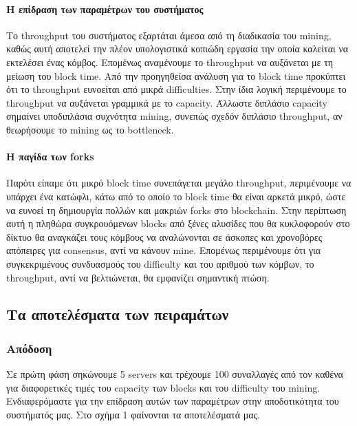 \documentclass[titlepage]{article}
\begin{document}
\paragraph{Η επίδραση των παραμέτρων του συστήματος}

Το throughput του συστήματος εξαρτάται άμεσα από τη διαδικασία του mining, καθώς αυτή αποτελεί την πλέον υπολογιστικά κοπιώδη εργασία την οποία καλείται να εκτελέσει ένας κόμβος. Επομένως αναμένουμε το throughput να αυξάνεται με τη μείωση του block time. Από την προηγηθείσα ανάλυση για το block time προκύπτει ότι το throughput ευνοείται από μικρά difficulties. Στην ίδια λογική περιμένουμε το throughput να αυξάνεται γραμμικά με το capacity. Άλλωστε διπλάσιο capacity σημαίνει υποδιπλάσια συχνότητα mining, συνεπώς σχεδόν διπλάσιο throughput, αν θεωρήσουμε το mining ως το bottleneck.

\paragraph{Η παγίδα των forks}

Παρότι είπαμε ότι μικρό block time συνεπάγεται μεγάλο throughput, περιμένουμε να υπάρχει ένα κατώφλι, κάτω από το οποίο το block time θα είναι αρκετά μικρό, ώστε να ευνοεί τη δημιουργία πολλών και μακριών forks στο blockchain. Στην περίπτωση αυτή η πληθώρα συγκρουόμενων blocks από ξένες αλυσίδες που θα κυκλοφορούν στο δίκτυο θα αναγκάζει τους κόμβους να αναλώνονται σε άσκοπες και χρονοβόρες απόπειρες για consensus, αντί να κάνουν mine. Επομένως περιμένουμε ότι για συγκεκριμένους συνδυασμούς του difficulty και του αριθμού των κόμβων, το throughput, αντί να βελτιώνεται, θα εμφανίζει σημαντική πτώση.

\subsection{Τα αποτελέσματα των πειραμάτων}

\subsubsection{Απόδοση}

Σε πρώτη φάση σηκώνουμε 5 servers και τρέχουμε 100 συναλλαγές από τον καθένα για διαφορετικές τιμές του capacity των blocks και του difficulty του mining. Ενδιαφερόμαστε για την επίδραση αυτών των παραμέτρων στην αποδοτικότητα του συστήματός μας. Στο σχήμα 1 φαίνονται τα αποτελέσματά μας.
\end{document}
